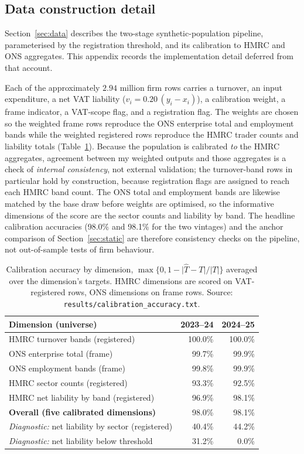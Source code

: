 \subsection{Data construction detail}
\label{app:data}

Section~\ref{sec:data} describes the two-stage synthetic-population pipeline,
parameterised by the registration threshold, and its calibration to HMRC and ONS
aggregates. This appendix records the implementation detail deferred from that
account.

Each of the approximately $2.94$ million firm rows carries a turnover, an input
expenditure, a net VAT liability ($v_i = 0.20\,(y_i - x_i)$), a calibration
weight, a frame indicator, a VAT-scope flag, and a registration flag. The
weights are chosen so the weighted frame rows reproduce the ONS enterprise
total and employment bands while the weighted registered rows reproduce the
HMRC trader counts and liability totals (Table~\ref{tab:calibration}). Because
the population is calibrated \emph{to} the HMRC aggregates, agreement between
my weighted outputs and those aggregates is a check of \emph{internal
consistency}, not external validation; the turnover-band rows in particular
hold by construction, because registration flags are assigned to reach each
HMRC band count. The ONS total and employment bands are likewise matched by the
base draw before weights are optimised, so the informative dimensions of the
score are the sector counts and liability by band. The headline
calibration accuracies (98.0\% and 98.1\% for the two
vintages) and the anchor comparison of Section~\ref{sec:static} are therefore
consistency checks on the pipeline, not out-of-sample tests of firm behaviour.

\begin{table}[htbp]
\centering
\caption{Calibration accuracy by dimension, $\max\{0,1-\lvert\widehat{T}-T\rvert/\lvert T\rvert\}$
averaged over the dimension's targets. HMRC dimensions are scored on
VAT-registered rows, ONS dimensions on frame rows. Source:
\texttt{results/calibration\_accuracy.txt}.}
\label{tab:calibration}
\begin{tabular}{lrr}
\toprule
Dimension (universe) & 2023--24 & 2024--25 \\
\midrule
HMRC turnover bands (registered) & 100.0\% & 100.0\% \\
ONS enterprise total (frame) & 99.7\% & 99.9\% \\
ONS employment bands (frame) & 99.8\% & 99.9\% \\
HMRC sector counts (registered) & 93.3\% & 92.5\% \\
HMRC net liability by band (registered) & 96.9\% & 98.1\% \\
\midrule
\textbf{Overall (five calibrated dimensions)} & 98.0\% & 98.1\% \\
\midrule
\emph{Diagnostic:} net liability by sector (registered) & 40.4\% & 44.2\% \\
\emph{Diagnostic:} net liability below threshold & 31.2\% & 0.0\% \\
\bottomrule
\end{tabular}
\end{table}


